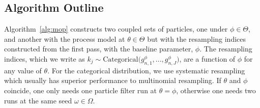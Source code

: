 \documentclass[9pt,twocolumn,pnasresearcharticle]{pnas-new}
\newcommand\arxiv[2]{#2} %
\begin{document}
\arxiv{}{\vspace*{-2mm}}
\subsection{Algorithm Outline} 

Algorithm~\ref{alg:mop} constructs two coupled sets of particles, one under $\phi \in \Theta$, and another with the process model at $\theta \in \Theta$ but with the resampling indices constructed from the first pass, with the baseline parameter, $\phi$.
The resampling indices, which we write as $k_j \sim \text{Categorical}\big(g^{\phi}_{n,1},...,g^{\phi}_{n,J}\big)$, are a function of $\phi$ for any value of $\theta$.
For the categorical distribution, we use systematic resampling \cite{arulampalam02,king16} which usually has superior performance to multinomial resampling.
If $\theta$ and $\phi$ coincide, one only needs one particle filter run at $\theta=\phi$, otherwise one needs two runs at the same seed $\omega \in \Omega$.
\end{document}

